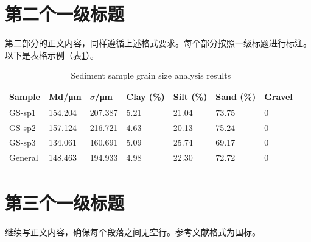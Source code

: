 \documentclass{mystyle} %
\begin{document}
\section{第二个一级标题}
第二部分的正文内容，同样遵循上述格式要求。每个部分按照一级标题进行标注。以下是表格示例（表\ref{tab:grain size}）。

\begin{table}[ht]
     \centering
     \caption{\label{tab:grain size}Sediment sample grain size analysis results}
     \begin{tabularx}{\textwidth}{lXXXXXX} %
     \hline
      \textbf{Sample} & \textbf{Md/μm} & \textbf{$\sigma$/μm} & \textbf{Clay (\%)} & \textbf{Silt (\%)} & \textbf{Sand (\%)} & \textbf{Gravel} \\
     \hline
     GS-sp1 & 154.204 & 207.387 & 5.21 & 21.04 & 73.75 & 0 \\
     GS-sp2 & 157.124 & 216.721 & 4.63 & 20.13 & 75.24 & 0 \\
     GS-sp3 & 134.061 & 160.691 & 5.09 & 25.74 & 69.17 & 0 \\
     General  & 148.463 & 194.933 & 4.98 & 22.30 & 72.72 & 0 \\
     \hline
     \end{tabularx}
\end{table}




\section{第三个一级标题}
继续写正文内容，确保每个段落之间无空行\cite{example1}。参考文献格式为国标。



\newpage
\printbibliography[heading=bibliography,title={参考文献}]
\end{document}
